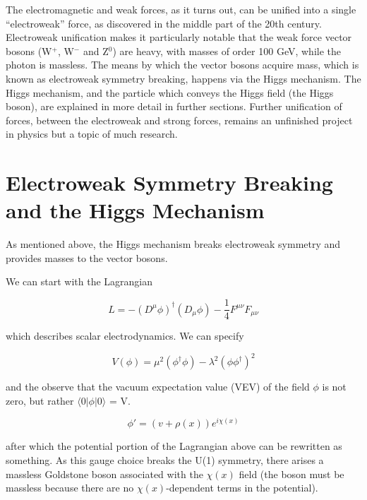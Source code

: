 \documentclass[11pt]{article}
\begin{document}
The electromagnetic and weak forces, as it turns out, can be unified into a single ``electroweak'' force, as discovered in the middle part of the 20th century.  Electroweak unification makes it particularly notable that the weak force vector bosons (W$^+$, W$^-$ and Z$^0$) are heavy, with masses of order 100 GeV, while the photon is massless.  The means by which the vector bosons acquire mass, which is known as electroweak symmetry breaking, happens via the Higgs mechanism.  The Higgs mechanism, and the particle which conveys the Higgs field (the Higgs boson), are explained in more detail in further sections.  Further unification of forces, between the electroweak and strong forces, remains an unfinished project in physics but a topic of much research.  

\section{Electroweak Symmetry Breaking and the Higgs Mechanism}
 
As mentioned above, the Higgs mechanism breaks electroweak symmetry and provides masses to the vector bosons.  

We can start with the Lagrangian

\begin{equation}
L = -(D^\mu \phi) ^\dagger (D_\mu \phi)-\frac{1}{4}F^{\mu \nu}F_{\mu \nu}
\label{EMLagrangian}
\end{equation}

which describes scalar electrodynamics.  We can specify 

\begin{equation}
V(\phi) =  \mu^2(\phi ^\dagger \phi) - \lambda^2 (\phi \phi^\dagger)^2
\label{Vtostart}
\end{equation}

and the observe that the vacuum expectation value (VEV) of the field $\phi$ is not zero, but rather $\langle 0 | \phi | 0 \rangle$ = V.  

 
 \begin{equation}
 \phi ' = (v+\rho (x)) e^{i\chi (x)}
 \end{equation}
 
 after which the potential portion of the Lagrangian above can be rewritten as something.  As this gauge choice breaks the U(1) symmetry, there arises a massless Goldstone boson associated with the $\chi(x)$ field (the boson must be massless because there are no $\chi(x)$-dependent terms in the potential).
 
\end{document}
